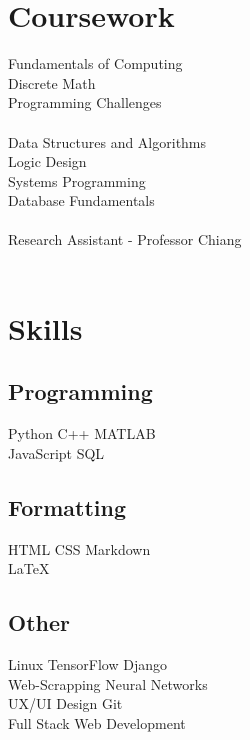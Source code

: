\documentclass[]{yoshi}
\begin{document}
\begin{minipage}[t]{0.33\textwidth}

\section{Coursework}
Fundamentals of Computing \\
Discrete Math\\
Programming Challenges \\
{\footnotesize \textit{\textbf{ }}} \\
\sectionsep
{}
Data Structures and Algorithms \\
Logic Design \\
Systems Programming \\
Database Fundamentals \\
{\footnotesize \textit{\textbf{ }}} \\
Research Assistant - Professor Chiang \\
{\footnotesize \textit{\textbf{ }}} \\
\sectionsep


\section{Skills}
\subsection{Programming}
Python \textbullet{} C++ \textbullet{} MATLAB \\
JavaScript \textbullet{} SQL \\
\sectionsep
\subsection{Formatting}
HTML \textbullet{} CSS \textbullet{} Markdown \\
\LaTeX\ \\
\sectionsep
\subsection{Other}
Linux \textbullet{} TensorFlow \textbullet{} Django \\
Web-Scrapping \textbullet{} Neural Networks \\
UX/UI Design \textbullet{} Git \\
Full Stack Web Development \\


%
%

\end{minipage}
\end{document}
